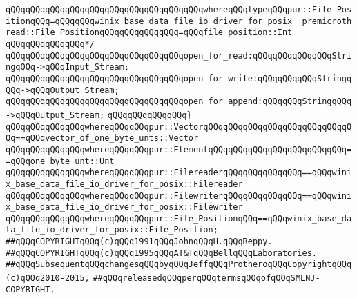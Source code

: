 \verb|qQQqqQQqqQQqqQQqqQQqqQQqqQQqqQQqqQQqqQQqwhereqQQqtypeqQQqpur::File_PositionqQQq=qQQqqQQqwinix_base_data_file_io_driver_for_posix__premicrothread::File_PositionqQQqqQQqqQQqqQQq=qQQqfile_position::Int|\newline
\verb|qQQqqQQqqQQqqQQq*/|\newline
\newline
\verb|qQQqqQQqqQQqqQQqqQQqqQQqqQQqqQQqqQQqopen_for_read:qQQqqQQqqQQqqQQqStringqQQq->qQQqInput_Stream;|\newline
\verb|qQQqqQQqqQQqqQQqqQQqqQQqqQQqqQQqqQQqopen_for_write:qQQqqQQqqQQqStringqQQq->qQQqOutput_Stream;|\newline
\verb|qQQqqQQqqQQqqQQqqQQqqQQqqQQqqQQqqQQqopen_for_append:qQQqqQQqStringqQQq->qQQqOutput_Stream;|\newline
\verb|qQQqqQQqqQQqqQQq}|\newline
\verb|qQQqqQQqqQQqqQQqwhereqQQqqQQqpur::VectorqQQqqQQqqQQqqQQqqQQqqQQqqQQqqQQq==qQQqvector_of_one_byte_unts::Vector|\newline
\verb|qQQqqQQqqQQqqQQqwhereqQQqqQQqpur::ElementqQQqqQQqqQQqqQQqqQQqqQQqqQQq==qQQqone_byte_unt::Unt|\newline
\verb|qQQqqQQqqQQqqQQqwhereqQQqqQQqpur::FilereaderqQQqqQQqqQQqqQQq==qQQqwinix_base_data_file_io_driver_for_posix::Filereader|\newline
\verb|qQQqqQQqqQQqqQQqwhereqQQqqQQqpur::FilewriterqQQqqQQqqQQqqQQq==qQQqwinix_base_data_file_io_driver_for_posix::Filewriter|\newline
\verb|qQQqqQQqqQQqqQQqwhereqQQqqQQqpur::File_PositionqQQq==qQQqwinix_base_data_file_io_driver_for_posix::File_Position;|\newline
\newline
\newline
\verb|##qQQqCOPYRIGHTqQQq(c)qQQq1991qQQqJohnqQQqH.qQQqReppy.|\newline
\verb|##qQQqCOPYRIGHTqQQq(c)qQQq1995qQQqAT&TqQQqBellqQQqLaboratories.|\newline
\verb|##qQQqSubsequentqQQqchangesqQQqbyqQQqJeffqQQqProtheroqQQqCopyrightqQQq(c)qQQq2010-2015,|\newline
\verb|##qQQqreleasedqQQqperqQQqtermsqQQqofqQQqSMLNJ-COPYRIGHT.|\newline

